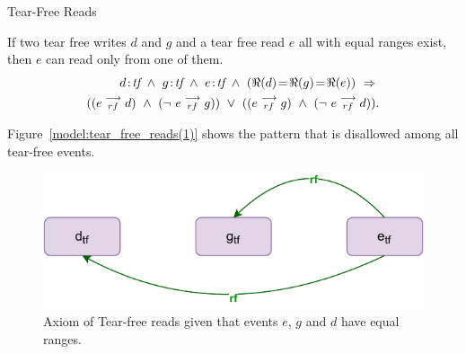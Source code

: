         \begin{axiom}{Tear-Free Reads} 
            \label{TfRe}

            If two tear free writes $d$ and $g$ and a tear free read $e$ all with equal ranges exist, then $e$ can read only from one of them\footnotemark. 
            \begin{align*}
                \et{d}{tf}\ \wedge\ \et{g}{tf} \ \wedge \ \et{e}{tf} 
                  \ \wedge \ 
                  (\Re(d) \!=\! \Re(g) \!=\! \Re(e)) 
                  \ \Rightarrow{} \\ 
                      ((\reln{e}{rf}{d}) 
                      \ \wedge \ 
                      (\neg \ \reln{e}{rf}{g})) 
                  \ \vee \  
                      ((\reln{e}{rf}{g}) 
                      \ \wedge \
                      (\neg \ \reln{e}{rf}{d})).
            \end{align*}
                    
            Figure~\ref{model:tear_free_reads(1)} shows the pattern that is disallowed among all tear-free events. 
            \begin{figure}[H]
                \centering
                \includegraphics[scale=0.7]{3.ECMAScriptMemoryModel/TearFreeReads.pdf}
                \caption{Axiom of Tear-free reads given that events $e$, $g$ and $d$ have equal ranges.}
                \label{model:tear_free_reads}
            \end{figure}

        \end{axiom}

